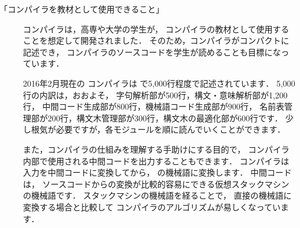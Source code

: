 \begin{description}
\item[「コンパイラを教材として使用できること」]
\cmm コンパイラは，高専や大学の学生が，
コンパイラの教材として使用することを想定して開発されました．
そのため，コンパイラがコンパクトに記述でき，
コンパイラのソースコードを学生が読めることも目標になっています．

2016年2月現在の \cmm コンパイラは \cl で5,000行程度で記述されています．
5,000行の内訳は，おおよそ，
字句解析部が500行，構文・意味解析部が1,200行，
中間コード生成部が800行，機械語コード生成部が900行，
名前表管理部が200行，構文木管理部が300行，構文木の最適化部が600行です．
少し根気が必要ですが，各モジュールを順に読んでいくことができます．

また，コンパイラの仕組みを理解する手助けにする目的で，
コンパイラ内部で使用される中間コードを出力することもできます．
\cmm コンパイラは入力を中間コードに変換してから，
\tac の機械語に変換します．
中間コードは，
ソースコードからの変換が比較的容易にできる仮想スタックマシンの機械語です．
スタックマシンの機械語を経ることで，
直接\tac の機械語に変換する場合と比較して
コンパイラのアルゴリズムが易しくなっています．

\end{description}
